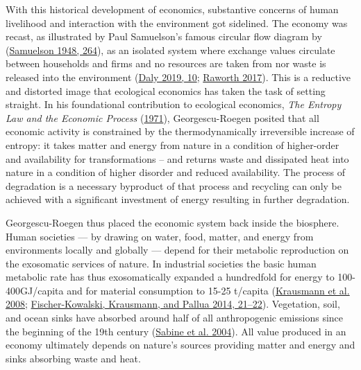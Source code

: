 \documentclass[a4paper, nobind]{templates/ociamthesis}
\begin{document}
With this historical development of economics, substantive concerns of human livelihood and interaction with the environment got sidelined. The economy was recast, as illustrated by Paul Samuelson's famous circular flow diagram by (\protect\hyperlink{ref-samuelson_economics_1948}{Samuelson 1948, 264}), as an isolated system where exchange values circulate between households and firms and no resources are taken from nor waste is released into the environment (\protect\hyperlink{ref-daly_growthism_2019}{Daly 2019, 10}; \protect\hyperlink{ref-raworth_doughnut_2017}{Raworth 2017}). This is a reductive and distorted image that ecological economics has taken the task of setting straight. In his foundational contribution to ecological economics, \emph{The Entropy Law and the Economic Process} (\protect\hyperlink{ref-georgescu-roegen_entropy_1971}{1971}), Georgescu-Roegen posited that all economic activity is constrained by the thermodynamically irreversible increase of entropy: it takes matter and energy from nature in a condition of higher-order and availability for transformations -- and returns waste and dissipated heat into nature in a condition of higher disorder and reduced availability. The process of degradation is a necessary byproduct of that process and recycling can only be achieved with a significant investment of energy resulting in further degradation.

Georgescu-Roegen thus placed the economic system back inside the biosphere. Human societies --- by drawing on water, food, matter, and energy from environments locally and globally --- depend for their metabolic reproduction on the exosomatic services of nature. In industrial societies the basic human metabolic rate has thus exosomatically expanded a hundredfold for energy to 100-400GJ/capita and for material consumption to 15-25 t/capita (\protect\hyperlink{ref-krausmann_global_2008}{Krausmann et al. 2008}; \protect\hyperlink{ref-fischer-kowalski_sociometabolic_2014}{Fischer-Kowalski, Krausmann, and Pallua 2014, 21--22}). Vegetation, soil, and ocean sinks have absorbed around half of all anthropogenic emissions since the beginning of the 19th century (\protect\hyperlink{ref-sabine_oceanic_2004}{Sabine et al. 2004}). All value produced in an economy ultimately depends on nature's sources providing matter and energy and sinks absorbing waste and heat.
\end{document}
